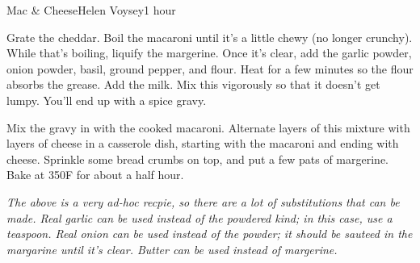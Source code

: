 \begin{recipe}{Mac \& Cheese}{Helen Voysey}{1 hour}

  Grate the cheddar. Boil the macaroni until it's a little chewy (no longer
  crunchy). While that's boiling, liquify the margerine. Once it's clear, add
  the garlic powder, onion powder, basil, ground pepper, and flour. Heat for a
  few minutes so the flour absorbs the grease. Add the milk. Mix this
  vigorously so that it doesn't get lumpy. You'll end up with a spice gravy.

  Mix the gravy in with the cooked macaroni. Alternate layers of this mixture
  with layers of cheese in a casserole dish, starting with the macaroni and
  ending with cheese. Sprinkle some bread crumbs on top, and put a few pats of
  margerine. Bake at 350\0F for about a half hour.
\end{recipe}
{\it The above is a very ad-hoc recpie, so there are a lot of substitutions
  that can be made. Real garlic can be used instead of the powdered kind; in
  this case, use a teaspoon. Real onion can be used instead of the powder; it
  should be sauteed in the margarine until it's clear. Butter can be used
  instead of margerine.}
